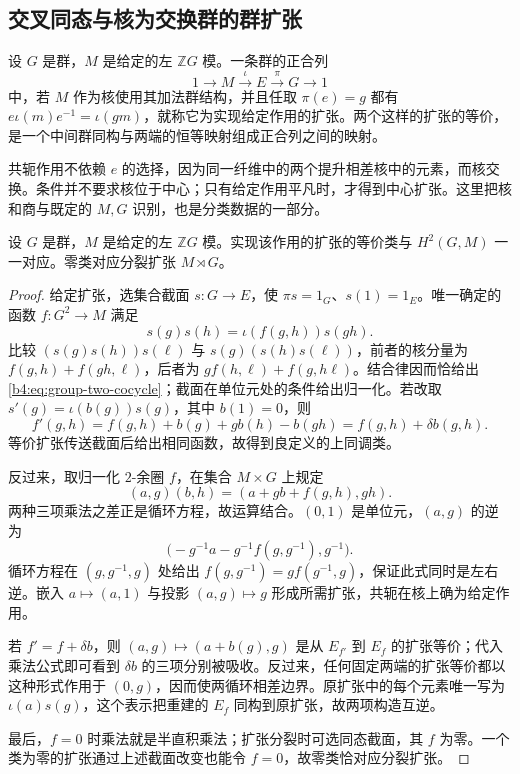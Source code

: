 \subsection{交叉同态与核为交换群的群扩张}
\label{b4:subsec:1102:02}

\begin{definition}\label{b4:def:extension-fixed-action}
设 \(G\) 是群，\(M\) 是给定的左 \(\mathbb ZG\) 模。一条群的正合列
\[
1\longrightarrow M\xrightarrow{\iota}E\xrightarrow{\pi}G\longrightarrow1
\]
中，若 \(M\) 作为核使用其加法群结构，并且任取 \(\pi(e)=g\) 都有
\(e\iota(m)e^{-1}=\iota(gm)\)，就称它为实现给定作用的扩张。两个这样的扩张的等价，是一个中间群同构与两端的恒等映射组成正合列之间的映射。
\end{definition}

共轭作用不依赖 \(e\) 的选择，因为同一纤维中的两个提升相差核中的元素，而核交换。条件并不要求核位于中心；只有给定作用平凡时，才得到中心扩张。这里把核和商与既定的 \(M,G\) 识别，也是分类数据的一部分。

\begin{theorem}[群扩张的上同调分类]\label{b4:thm:group-extensions-h2}
设 \(G\) 是群，\(M\) 是给定的左 \(\mathbb ZG\) 模。实现该作用的扩张的等价类与 \(H^2(G,M)\) 一一对应。零类对应分裂扩张 \(M\rtimes G\)。
\end{theorem}
\begin{proof}
给定扩张，选集合截面 \(s:G\to E\)，使 \(\pi s=1_G\)、\(s(1)=1_E\)。唯一确定的函数 \(f:G^2\to M\) 满足
\[
s(g)s(h)=\iota(f(g,h))s(gh).
\]
比较 \((s(g)s(h))s(\ell)\) 与 \(s(g)(s(h)s(\ell))\)，前者的核分量为 \(f(g,h)+f(gh,\ell)\)，后者为 \(g f(h,\ell)+f(g,h\ell)\)。结合律因而恰给出\eqref{b4:eq:group-two-cocycle}；截面在单位元处的条件给出归一化。若改取 \(s'(g)=\iota(b(g))s(g)\)，其中 \(b(1)=0\)，则
\[
f'(g,h)=f(g,h)+b(g)+g b(h)-b(gh)=f(g,h)+\delta b(g,h).
\]
等价扩张传送截面后给出相同函数，故得到良定义的上同调类。

反过来，取归一化 \(2\)-余圈 \(f\)，在集合 \(M\times G\) 上规定
\[
(a,g)(b,h)=(a+g b+f(g,h),gh).
\]
两种三项乘法之差正是循环方程，故运算结合。\((0,1)\) 是单位元，\((a,g)\) 的逆为
\[
\bigl(-g^{-1}a-g^{-1}f(g,g^{-1}),g^{-1}\bigr).
\]
循环方程在 \((g,g^{-1},g)\) 处给出 \(f(g,g^{-1})=g f(g^{-1},g)\)，保证此式同时是左右逆。嵌入 \(a\mapsto(a,1)\) 与投影 \((a,g)\mapsto g\) 形成所需扩张，共轭在核上确为给定作用。

若 \(f'=f+\delta b\)，则
\((a,g)\mapsto(a+b(g),g)\)
是从 \(E_{f'}\) 到 \(E_f\) 的扩张等价；代入乘法公式即可看到 \(\delta b\) 的三项分别被吸收。反过来，任何固定两端的扩张等价都以这种形式作用于 \((0,g)\)，因而使两循环相差边界。原扩张中的每个元素唯一写为 \(\iota(a)s(g)\)，这个表示把重建的 \(E_f\) 同构到原扩张，故两项构造互逆。

最后，\(f=0\) 时乘法就是半直积乘法；扩张分裂时可选同态截面，其 \(f\) 为零。一个类为零的扩张通过上述截面改变也能令 \(f=0\)，故零类恰对应分裂扩张。
\end{proof}


